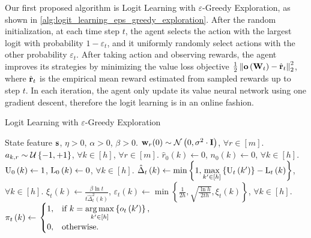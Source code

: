 Our first proposed algorithm is Logit Learning with $\varepsilon$-Greedy Exploration, as shown in \cref{alg:logit_learning_eps_greedy_exploration}. After the random initialization, at each time step $t$, the agent selects the action with the largest logit with probability $1 - \varepsilon_t$, and it uniformly randomly select actions with the other probability $\varepsilon_t$. After taking action and observing rewards, the agent improves its strategies by minimizing the value loss objective $\frac{1}{2} \left\| {\mathbf{o}}\left( {\mathbf{W}}_t\right) - \hat{{\mathbf{r}}}_t \right\|_2^2$, where $\hat{{\mathbf{r}}}_t$ is the empirical mean reward estimated from sampled rewards up to step $t$. In each iteration, the agent only update its value neural network using one gradient descent, therefore the logit learning is in an online fashion.


\begin{algorithm}[t]
	\caption{Logit Learning with $\varepsilon$-Greedy Exploration}
	\label{alg:logit_learning_eps_greedy_exploration}
	\begin{algorithmic}
		 State feature ${\mathbf{s}}$, $\eta > 0$, $\alpha > 0$, $\beta > 0$.
		\STATE ${\mathbf{w}}_r(0) \sim {\mathcal{N}}\left( 0, \sigma^2 \cdot {\mathbf{I}} \right)$, $\forall r \in [m]$.
		\STATE $a_{k, r} \sim {\mathcal{U}}\left\{-1, +1\right\}$, $\forall k \in [h]$, $\forall r \in [m]$.
		\STATE $\hat{r}_{0}\left(k\right) \gets 0$, $n_{0}\left(k\right) \gets 0$, $\forall k \in [h]$.
		\STATE ${\text{U}}_{0}\left(k\right) \gets 1$, ${\text{L}}_{0}\left(k\right) \gets 0$, $\forall k \in [h]$.
		\STATE $\hat{\Delta}_{t}\left(k\right) \gets \min\left\{ 1,  \max\limits_{k^\prime \in \left[h\right]}\left\{ {\text{U}}_{t}\left(k^\prime\right) \right\}  - {\text{L}}_{t}\left(k\right)\right\} $, $\forall k \in [h]$.
		\STATE $\xi_t\left(k\right) \gets \frac{\beta \ln{t}}{t \hat{\Delta}_t^2\left(k\right)}$, $\varepsilon_t\left(k\right) \gets \min\left\{ \frac{1}{2 h}, \sqrt{\frac{\ln{h}}{2 t h}},  \xi_t\left(k\right) \right\}$, $\forall k \in [h]$.
		\STATE $\pi_{t}\left(k\right) \gets \left. 
		    \begin{cases}
		    1, & \text{if } k = \operatorname*{arg\,max}\limits_{k^\prime \in \left[h\right]}\left\{ o_{t}\left(k^\prime\right)\right\}, \\
		    0, & \text{otherwise}.
		    \end{cases}
		    \right.$

\end{algorithmic}
\end{algorithm}
